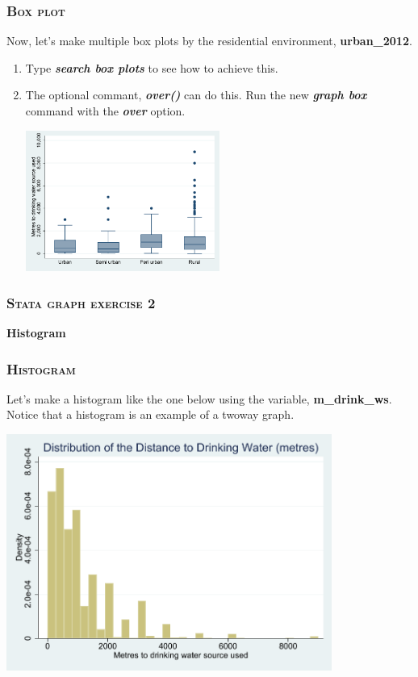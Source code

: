 \documentclass[10pt]{beamer}
\begin{document}
	\begin{frame}
	\frametitle{\textsc{Box plot}}	
		 Now, let's make multiple box plots by the residential environment, \textbf{urban\_2012}.
		\begin{enumerate}
			 \item Type \textbf{\textit{search box plots}} to see how to achieve this.
			 \onslide<2-> \item The optional commant, \textbf{\textit{over()}} can do this.
								Run the new \textbf{\textit{graph box}} command with the \textbf{\textit{over}} option.
		
\begin{stlog}\end{stlog}
\begin{center}
    \includegraphics[width=0.5\textwidth]{boxplot_1.pdf}
\end{center}
		\end{enumerate}
	\end{frame}

	\begin{frame}
	\frametitle{\textsc{Stata graph exercise 2}}
		\begin{center}
		\Large \textbf{Histogram}
		\end{center}
	\end{frame}		
	
	\begin{frame}
	\frametitle{\textsc{Histogram}}
		Let's make a histogram like the one below using the variable, \textbf{m\_drink\_ws}.
		Notice that a histogram is an example of a twoway graph.
	
\begin{center}
    \includegraphics[width=0.8\textwidth]{hist_1.pdf}
\end{center}
	\end{frame}
	
\end{document}
